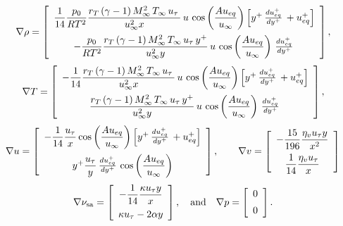 \documentclass[10pt]{article}
\newcommand{\Dueqplusyplus}{\, \frac{du_{eq}^+}{dy^+}\,}
\newcommand{\sa}{\nu_{\mathrm{sa}}}
\begin{document}
\begin{equation*}
\nabla  \rho= \left[ \begin{array}{c}
 \dfrac{1}{14}\dfrac{p_0}{R T^2} \dfrac{r_T\, (\gamma-1)\, M_{\infty}^2 \,T_{\infty}\, u_\tau \, }{u_{\infty}^2 x}\, u \,\cos\left(\dfrac{A u_{eq}}{u_{\infty}}\right) \left[y^{+} \Dueqplusyplus+u_{eq}^{+}\right]\vspace{5pt} \\
- \dfrac{p_0}{R T^2}  \dfrac{r_T\, (\gamma-1)\, M_{\infty}^2 \,T_{\infty}\,  u_\tau\, y^{+}}{u_{\infty}^2 y}\, u \,\cos\left(\dfrac{A u_{eq}}{u_{\infty}}\right)   \Dueqplusyplus
\end{array} \right],
\end{equation*}
\begin{equation*}
\nabla T = \left[ \begin{array}{c}
 -\dfrac{1}{14} \dfrac{r_T\, (\gamma-1)\, M_{\infty}^2 \,T_{\infty}\, u_\tau \, }{u_{\infty}^2 x}\, u \,\cos\left(\dfrac{A u_{eq}}{u_{\infty}}\right) \left[y^{+} \Dueqplusyplus+u_{eq}^{+}\right]\vspace{5pt}\\
 \dfrac{r_T\, (\gamma-1)\, M_{\infty}^2 \,T_{\infty}\,  u_\tau\,  y^{+} }{u_{\infty}^2 y}\, u \,\cos\left(\dfrac{A u_{eq}}{u_{\infty}}\right)  \Dueqplusyplus
\end{array} \right],
\end{equation*}
\begin{equation*}
\nabla u = \left[ \begin{array}{c}
  -\dfrac{1}{14}\dfrac{u_\tau }{x}\cos\left(\dfrac{A u_{eq}}{u_{\infty}}\right) \left[y^{+} \Dueqplusyplus+u_{eq}^{+}\right] \vspace{5pt}\\
  y^{+} \dfrac{ u_\tau }{y} \Dueqplusyplus \cos\left(\dfrac{A u_{eq}}{u_{\infty}}\right)
\end{array} \right],
%
\quad\quad
%
\nabla  v= \left[ \begin{array}{c}
 -\dfrac{15}{196}\dfrac{ \eta_v u_\tau y}{x^2} \vspace{5pt}\\
 \dfrac{1}{14}\dfrac{\eta_v u_\tau}{x}
\end{array} \right]
\end{equation*}
\begin{equation*}
\nabla \sa = \left[ \begin{array}{c}
 -\dfrac{1}{14}\dfrac{ \kappa u_\tau y}{x} \vspace{5pt}\\
 \kappa u_\tau-2 \alpha y
\end{array} \right],
%
\quad\mbox{and}\quad
%
\nabla p = \left[ \begin{array}{c}
 0\vspace{5pt}\\
 0
\end{array} \right].
\end{equation*}
\end{document}

